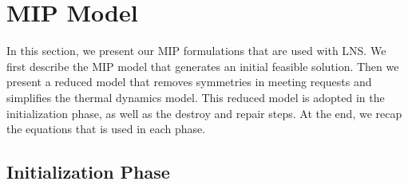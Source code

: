 



\section{MIP Model}\label{sec:lns_mip}

In this section, we present our MIP formulations that are used with LNS. We first describe the MIP model that generates an initial feasible solution.  Then we present a reduced model that removes symmetries in meeting requests and simplifies the thermal dynamics model. This reduced model is adopted in the initialization phase, as well as the destroy and repair steps. At the end, we recap the equations that is used in each phase.


\subsection{Initialization Phase}


